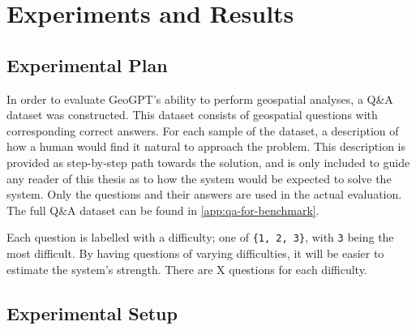 \chapter{Experiments and Results}
\label{cha:experiments}

\section{Experimental Plan}
\label{sec:experimentalPlan}

\begin{comment}
Trying and failing is a major part of research. However, to have a chance of success you need a plan driving the experimental research, just as you need a plan for your literature search. Further, plans are made to be revised and this revision ensures that any further decisions made are in line with the work already completed.

The plan should include what experiments or series of experiments are planned and what questions the individual or set of experiments aim to answer. Such questions should be connected to your research questions, so that in the evaluation of your results you can discuss the results wrt to the research questions.
\end{comment}

In order to evaluate GeoGPT's ability to perform geospatial analyses, a Q\&A dataset was constructed. This dataset consists of geospatial questions with corresponding correct answers. For each sample of the dataset, a description of how a human would find it natural to approach the problem. This description is provided  as step-by-step path towards the solution, and is only included to guide any reader of this thesis as to how the system would be expected to solve the system. Only the questions and their answers are used in the actual evaluation. The full Q\&A dataset can be found in \autoref{app:qa-for-benchmark}.

Each question is labelled with a difficulty; one of \texttt{\{1, 2, 3\}}, with \texttt{3} being the most difficult. By having questions of varying difficulties, it will be easier to estimate the system's strength. There are X questions for each difficulty.

\section{Experimental Setup}
\label{sec:experimentalSetup}




